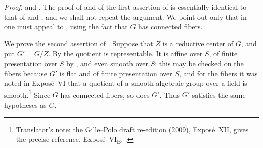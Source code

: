 \emph{Proof.}
\textup{} and \textup{}. The proof of \textup{} and of the
first assertion of \textup{} is essentially identical to that of
 and , and we shall not repeat the argument. We point out
only that in \textup{} one must appeal to , using the fact
that \(G\) has connected fibers.

We prove the second assertion of \textup{}. Suppose that \(Z\) is
a reductive center of \(G\), and put \(G'=G/Z\). By  the
quotient is representable. It is affine over \(S\), of finite
presentation over \(S\) by , and even smooth over \(S\):
this may be checked on the fibers because \(G'\) is flat and of
finite presentation over \(S\), and for the fibers it was noted in
Exposé~VI that a quotient of a smooth algebraic group over a field is
smooth.\footnote{Translator's note: the Gille--Polo draft re-edition
(2009), Exposé~XII, gives the precise reference, Exposé~VI\textsubscript{B},
.} Since \(G\) has connected fibers, so does \(G'\). Thus \(G'\)
satisfies the same hypotheses as \(G\).

